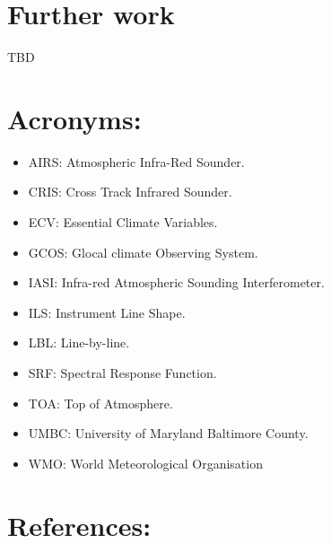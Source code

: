 \documentclass[11pt]{article}
\begin{document}
\section{Further work}
\label{sec:orgheadline14}
TBD

\section{Acronyms:}
\label{sec:orgheadline15}
\begin{itemize}
\item AIRS: Atmospheric Infra-Red Sounder.
\item CRIS: Cross Track Infrared Sounder.
\item ECV: Essential Climate Variables.
\item GCOS: Glocal climate Observing System.
\item IASI: Infra-red Atmospheric Sounding Interferometer.
\item ILS: Instrument Line Shape.
\item LBL: Line-by-line.
\item SRF: Spectral Response Function.
\item TOA: Top of Atmosphere.
\item UMBC: University of Maryland Baltimore County.
\item WMO: World Meteorological Organisation
\end{itemize}

\section{References:}
\label{sec:orgheadline16}
\end{document}
